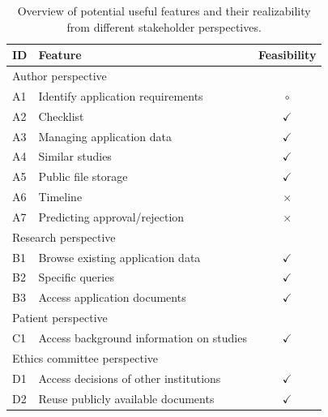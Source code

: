 \documentclass[10pt]{article}
\begin{document}
\renewcommand{\arraystretch}{2}%
\begin{table}
\centering
\begin{tabular}{|l|l|c|}
\hline
\textbf{ID} & \textbf{Feature} & \textbf{Feasibility} \\ \hline

\multicolumn{3}{|l|}{Author perspective} \\ \hline
A1      & Identify application requirements       &    $\circ$  \\ \hline
A2      &   Checklist    &   $\checkmark$   \\ \hline
A3      &    Managing application data   &   $\checkmark$   \\ \hline
A4      &   Similar studies    &   $\checkmark$   \\ \hline
A5      &   Public file storage    &   $\checkmark$   \\ \hline
A6      &   Timeline    &   $\times$   \\ \hline
A7      &   Predicting approval/rejection   &   $\times$   \\ \hline
\multicolumn{3}{|l|}{Research perspective} \\ \hline
B1      & Browse existing application data   &    $\checkmark$  \\ \hline
B2      &  Specific queries  &   $\checkmark$   \\ \hline
B3      &   Access application documents  &   $\checkmark$   \\ \hline
\multicolumn{3}{|l|}{Patient perspective} \\ \hline
C1 & Access background information on studies & $\checkmark$ \\ \hline
\multicolumn{3}{|l|}{Ethics committee perspective} \\ \hline
D1 & Access decisions of other institutions & $\checkmark$ \\ \hline
D2 & Reuse publicly available documents & $\checkmark$ \\ \hline
\end{tabular}
\caption{Overview of potential useful features and their realizability from different stakeholder perspectives.}
  \label{tab:featuresa}
\end{table}
\end{document}
